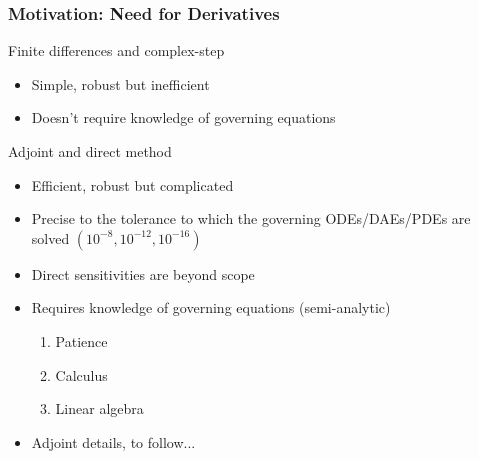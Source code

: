 \documentclass{beamer}
\begin{document}
\begin{frame}[fragile] 
  \frametitle{Motivation: Need for Derivatives}
  \begin{minipage}{\linewidth}
  \begin{minipage}{0.5\linewidth}\scriptsize{
      \begin{block}{Finite differences and complex-step}   
          \begin{itemize}
          \item Simple, robust but inefficient
          \item Doesn't require knowledge of governing equations
          \end{itemize}
      \end{block}
      \begin{block}{Adjoint and direct method}
      \begin{itemize}
      \item Efficient, robust but complicated
      \item Precise to the tolerance to which the governing ODEs/DAEs/PDEs
        are solved $(10^{-8}, 10^{-12}, 10^{-16})$
      \item Direct sensitivities are beyond scope
      \item Requires knowledge of governing equations (semi-analytic)
        \begin{enumerate}
        \item \scriptsize{Patience}
        \item \scriptsize{Calculus}
        \item \scriptsize{Linear algebra}
        \end{enumerate}
      \item Adjoint details, to follow...
      \end{itemize}
      \end{block}}
  \end{minipage}
  \begin{minipage}{0.6\linewidth}
    \begin{figure}
      \centering

\end{figure}
\end{minipage}
\end{minipage}
\end{frame}
\end{document}
